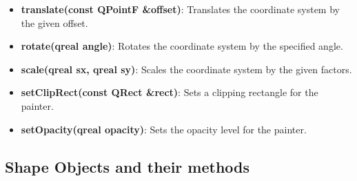 \documentclass{report}
\begin{document}
\begin{itemize}
        \item \textbf{translate(const QPointF \&offset)}: Translates the coordinate system by the given offset.
        \item \textbf{rotate(qreal angle)}: Rotates the coordinate system by the specified angle.
        \item \textbf{scale(qreal sx, qreal sy)}: Scales the coordinate system by the given factors.
        \item \textbf{setClipRect(const QRect \&rect)}: Sets a clipping rectangle for the painter.
        \item \textbf{setOpacity(qreal opacity)}: Sets the opacity level for the painter.
    \end{itemize}

    
    \pagebreak
    \subsection{Shape Objects and their methods}
\end{document}
